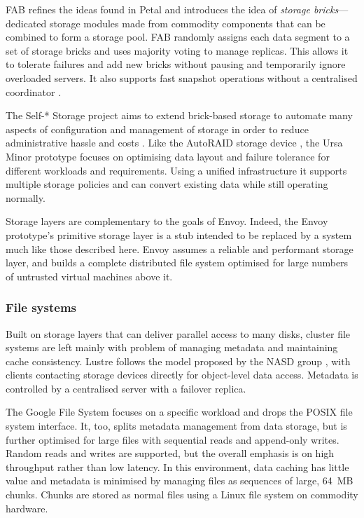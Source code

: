 FAB \cite{frolund,saito04} refines the ideas found in Petal and introduces the idea of \emph{storage bricks}---dedicated storage modules made from commodity components that can be combined to form a storage pool. FAB randomly assigns each data segment to a set of storage bricks and uses majority voting to manage replicas. This allows it to tolerate failures and add new bricks without pausing and temporarily ignore overloaded servers. It also supports fast snapshot operations without a centralised coordinator \cite{ji}.

The Self-* Storage project aims to extend brick-based storage to automate many aspects of configuration and management of storage in order to reduce administrative hassle and costs \cite{ganger03}. Like the AutoRAID storage device \cite{wilkes95}, the Ursa Minor prototype \cite{abd-el-malek} focuses on optimising data layout and failure tolerance for different workloads and requirements. Using a unified infrastructure it supports multiple storage policies and can convert existing data while still operating normally.

Storage layers are complementary to the goals of Envoy. Indeed, the Envoy prototype's primitive storage layer is a stub intended to be replaced by a system much like those described here. Envoy assumes a reliable and performant storage layer, and builds a complete distributed file system optimised for large numbers of untrusted virtual machines above it.

\subsubsection{File systems}

Built on storage layers that can deliver parallel access to many disks, cluster file systems are left mainly with problem of managing metadata and maintaining cache consistency. Lustre \cite{lustre} follows the model proposed by the NASD group \cite{gibson98a}, with clients contacting storage devices directly for object-level data access. Metadata is controlled by a centralised server with a failover replica.

The Google File System \cite{ghemawat} focuses on a specific workload and drops the POSIX file system interface. It, too, splits metadata management from data storage, but is further optimised for large files with sequential reads and append-only writes. Random reads and writes are supported, but the overall emphasis is on high throughput rather than low latency. In this environment, data caching has little value and metadata is minimised by managing files as sequences of large, 64~MB chunks. Chunks are stored as normal files using a Linux file system on commodity hardware.

